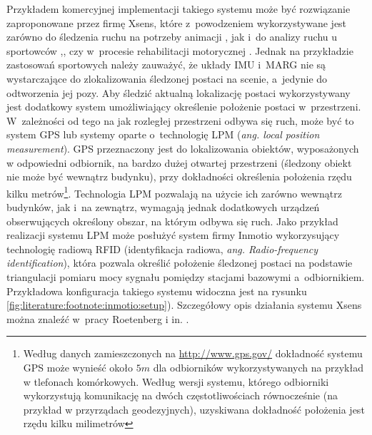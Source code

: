 Przykładem komercyjnej implementacji takiego systemu może być rozwiązanie zaproponowane przez firmę Xsens, które z~powodzeniem wykorzystywane jest zarówno do śledzenia ruchu na potrzeby animacji , jak i~do analizy ruchu u sportowców {,}, czy w~procesie rehabilitacji motorycznej . Jednak na przykładzie zastosowań sportowych  należy zauważyć, że układy IMU i~MARG nie są wystarczające do zlokalizowania śledzonej postaci na scenie, a~jedynie do odtworzenia jej pozy. Aby śledzić aktualną lokalizację postaci wykorzystywany jest dodatkowy system umożliwiający określenie położenie postaci w~przestrzeni. W~zależności od tego na jak rozległej przestrzeni odbywa się ruch, może być to system GPS lub systemy oparte o~technologię LPM (\emph{ang. local position measurement}). GPS przeznaczony jest do lokalizowania obiektów, wyposażonych w odpowiedni odbiornik, na bardzo dużej otwartej przestrzeni (śledzony obiekt nie może być wewnątrz budynku), przy dokładności określenia położenia rzędu kilku metrów\footnote{Według danych zamieszczonych na \url{http://www.gps.gov/} dokładność systemu GPS może wynieść około $5m$ dla odbiorników wykorzystywanych na przykład w tlefonach komórkowych. Według wersji systemu, którego  odbiorniki wykorzystują komunikację na dwóch częstotliwościach równocześnie (na przykład w przyrządach geodezyjnych), uzyskiwana dokładność położenia jest rzędu kilku milimetrów}. Technologia LPM pozwalają na użycie ich zarówno wewnątrz budynków, jak i~na zewnątrz, wymagają jednak dodatkowych urządzeń obserwujących określony obszar, na którym odbywa się ruch. Jako przykład realizacji systemu LPM może posłużyć system firmy Inmotio wykorzysujący technologię radiową RFID (identyfikacja radiowa, \emph{ang. Radio-frequency identification}), która pozwala określić położenie śledzonej postaci na podstawie triangulacji pomiaru mocy sygnału pomiędzy stacjami bazowymi a~odbiornikiem. Przykładowa konfiguracja takiego systemu widoczna jest na rysunku \ref{fig:literature:footnote:inmotio:setup}). Szczegółowy opis działania systemu Xsens można znaleźć w~pracy Roetenberg i in. \cite{Roetenberg2009}.
					
